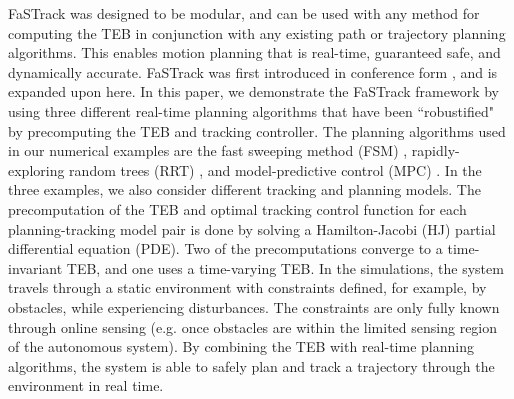 FaSTrack was designed to be modular, and can be used with any method for computing the TEB in conjunction with any existing path or trajectory planning algorithms.  
This enables motion planning that is real-time, guaranteed safe, and dynamically accurate. 
FaSTrack was first introduced in conference form \cite{herbert2017fastrack}, and is expanded upon here. In this paper, we demonstrate the FaSTrack framework by using three different real-time planning algorithms that have been ``robustified" by precomputing the TEB and tracking controller. 
The planning algorithms used in our numerical examples are the fast sweeping method (FSM) \cite{Takei2013}, rapidly-exploring random trees (RRT) \cite{Kuffner2000,Kavraki1996}, and model-predictive control (MPC) \cite{Qin2003,Zhang2017}. 
In the three examples, we also consider different tracking and planning models.
The precomputation of the TEB and optimal tracking control function for each planning-tracking model pair is done by solving a Hamilton-Jacobi (HJ) partial differential equation (PDE). 
Two of the precomputations converge to a time-invariant TEB, and one uses a time-varying TEB.
In the simulations, the system travels through a static environment with constraints defined, for example, by obstacles, while experiencing disturbances.
The constraints are only fully known through online sensing (e.g. once obstacles are within the limited sensing region of the autonomous system). 
By combining the TEB with real-time planning algorithms, the system is able to safely plan and track a trajectory through the environment in real time. 